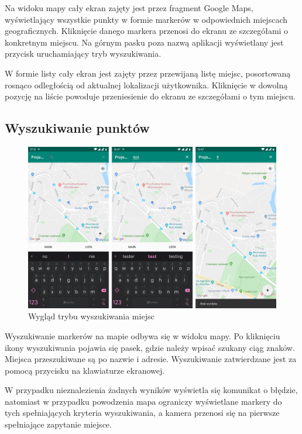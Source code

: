 \documentclass[polish,polish,a4paper,12pt]{article}
\begin{document}
	Na widoku mapy cały ekran zajęty jest przez fragment Google Maps, wyświetlający wszystkie punkty w formie markerów w odpowiednich miejscach geograficznych. Kliknięcie danego markera przenosi do ekranu ze szczegółami o konkretnym miejscu. Na górnym pasku poza nazwą aplikacji wyświetlany jest przycisk uruchamiający tryb wyszukiwania.

	W formie listy cały ekran jest zajęty przez przewijaną listę miejsc, posortowaną rosnąco odległością od aktualnej lokalizacji użytkownika. Kliknięcie w dowolną pozycję na liście powoduje przeniesienie do ekranu ze szczegółami o tym miejscu.

	\subsection{Wyszukiwanie punktów}

	\begin{figure}[H]
		\centering
		\includegraphics[width = \textwidth]{screenshot-search}
		\caption{Wygląd trybu wyszukiwania miejsc}
		\label{fig:screenshotsearch}
	\end{figure}

	Wyszukiwanie markerów na mapie odbywa się w widoku mapy. Po kliknięciu ikony wyszukiwania pojawia się pasek, gdzie należy wpisać szukany ciąg znaków. Miejsca przeszukiwane są po nazwie i adresie. Wyszukiwanie zatwierdzane jest za pomocą przycisku na klawiaturze ekranowej.

	W przypadku nieznalezienia żadnych wyników wyświetla się komunikat o błędzie, natomiast w przypadku powodzenia mapa ograniczy wyświetlane markery do tych spełniających kryteria wyszukiwania, a kamera przenosi się na pierwsze spełniające zapytanie miejsce.
\end{document}

